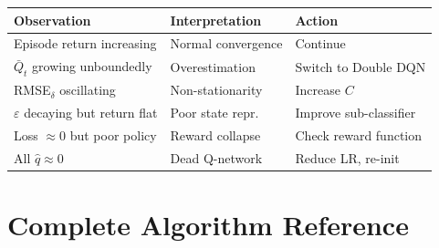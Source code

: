 \documentclass[12pt,a4paper]{article}
\theoremstyle{definition}
\theoremstyle{plain}
\theoremstyle{remark}
\begin{document}
\begin{tcolorbox}[keybox,title={DQN Training Convergence Checklist}]
\begin{tabular}{lll}
\toprule
\textbf{Observation} & \textbf{Interpretation} & \textbf{Action} \\
\midrule
Episode return increasing & Normal convergence & Continue \\
$\bar{Q}_t$ growing unboundedly & Overestimation & Switch to Double DQN \\
RMSE$_\delta$ oscillating & Non-stationarity & Increase $C$ \\
$\varepsilon$ decaying but return flat & Poor state repr.\ & Improve sub-classifier \\
Loss $\approx 0$ but poor policy & Reward collapse & Check reward function \\
All $\hat{q} \approx 0$ & Dead Q-network & Reduce LR, re-init \\
\bottomrule
\end{tabular}
\end{tcolorbox}

\newpage
\section{Complete Algorithm Reference}
\end{document}

